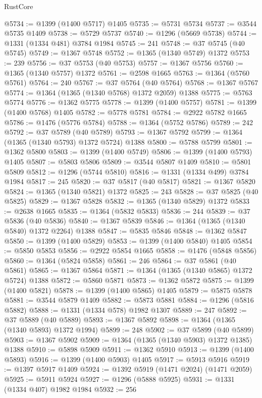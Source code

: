 \begin{lexlean}{RustCore}
\begin{coremodule}
@5734 := @1399 (@1400 @5717) @1405
@5735 := @5731 @5734
@5737 := @3544 @5735 @1409
@5738 := @5729 @5737
@5740 := @1296 (@5669 @5738)
@5744 := @1331 (@1334 @481) @3784 @1984
@5745 := 241
@5748 := @37 @5745 (@40 @5745)
@5749 := @1367 @5748
@5752 := @1365 (@1340 @5749) @1372
@5753 := 239
@5756 := @37 @5753 (@40 @5753)
@5757 := @1367 @5756
@5760 := @1365 (@1340 @5757) @1372
@5761 := @2598 @1665
@5763 := @1364 (@5760 @5761)
@5764 := 240
@5767 := @37 @5764 (@40 @5764)
@5768 := @1367 @5767
@5774 := @1364 (@1365 (@1340 @5768) @1372 @2059) @1388
@5775 := @5763 @5774
@5776 := @1362 @5775
@5778 := @1399 (@1400 @5757)
@5781 := @1399 (@1400 @5768) @1405
@5782 := @5778 @5781
@5784 := @2922 @5782 @1665
@5786 := @1476 (@5776 @5784)
@5788 := @1364 (@5752 @5786)
@5789 := 242
@5792 := @37 @5789 (@40 @5789)
@5793 := @1367 @5792
@5799 := @1364 (@1365 (@1340 @5793) @1372 @5724) @1388
@5800 := @5788 @5799
@5801 := @1362 @5800
@5803 := @1399 (@1400 @5749)
@5806 := @1399 (@1400 @5793) @1405
@5807 := @5803 @5806
@5809 := @3544 @5807 @1409
@5810 := @5801 @5809
@5812 := @1296 (@5744 @5810)
@5816 := @1331 (@1334 @499) @3784 @1984
@5817 := 245
@5820 := @37 @5817 (@40 @5817)
@5821 := @1367 @5820
@5824 := @1365 (@1340 @5821) @1372
@5825 := 243
@5828 := @37 @5825 (@40 @5825)
@5829 := @1367 @5828
@5832 := @1365 (@1340 @5829) @1372
@5833 := @2638 @1665
@5835 := @1364 (@5832 @5833)
@5836 := 244
@5839 := @37 @5836 (@40 @5836)
@5840 := @1367 @5839
@5846 := @1364 (@1365 (@1340 @5840) @1372 @2264) @1388
@5847 := @5835 @5846
@5848 := @1362 @5847
@5850 := @1399 (@1400 @5829)
@5853 := @1399 (@1400 @5840) @1405
@5854 := @5850 @5853
@5856 := @2922 @5854 @1665
@5858 := @1476 (@5848 @5856)
@5860 := @1364 (@5824 @5858)
@5861 := 246
@5864 := @37 @5861 (@40 @5861)
@5865 := @1367 @5864
@5871 := @1364 (@1365 (@1340 @5865) @1372 @5724) @1388
@5872 := @5860 @5871
@5873 := @1362 @5872
@5875 := @1399 (@1400 @5821)
@5878 := @1399 (@1400 @5865) @1405
@5879 := @5875 @5878
@5881 := @3544 @5879 @1409
@5882 := @5873 @5881
@5884 := @1296 (@5816 @5882)
@5888 := @1331 (@1334 @578) @1982 @1307
@5889 := 247
@5892 := @37 @5889 (@40 @5889)
@5893 := @1367 @5892
@5898 := @1364 (@1365 (@1340 @5893) @1372 @1994)
@5899 := 248
@5902 := @37 @5899 (@40 @5899)
@5903 := @1367 @5902
@5909 := @1364 (@1365 (@1340 @5903) @1372 @1385) @1388
@5910 := @5898 @5909
@5911 := @1362 @5910
@5913 := @1399 (@1400 @5893)
@5916 := @1399 (@1400 @5903) @1405
@5917 := @5913 @5916
@5919 := @1397 @5917 @1409
@5924 := @1392 @5919 (@1471 @2024) (@1471 @2059)
@5925 := @5911 @5924
@5927 := @1296 (@5888 @5925)
@5931 := @1331 (@1334 @407) @1982 @1984
@5932 := 256

\end{coremodule}
\end{lexlean}
